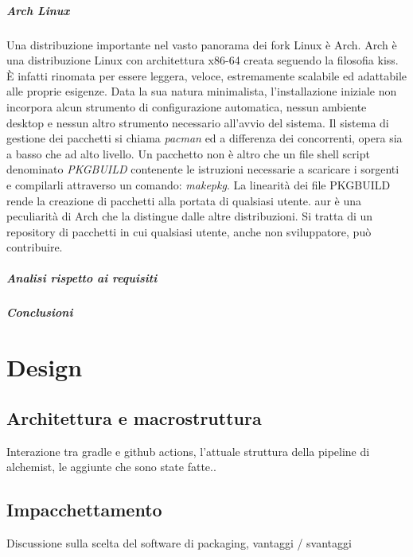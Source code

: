 \documentclass[12pt,a4paper,openright,twoside]{book}
\begin{document}
\paragraph{Arch Linux} Una distribuzione importante nel vasto panorama dei fork Linux è Arch. Arch è una distribuzione Linux con architettura x86-64 creata seguendo la filosofia \ac{kiss}. È infatti rinomata per essere leggera, veloce, estremamente scalabile ed adattabile alle proprie esigenze. Data la sua natura minimalista, l'installazione iniziale non incorpora alcun strumento di configurazione automatica, nessun ambiente desktop e nessun altro strumento necessario all'avvio del sistema. Il sistema di gestione dei pacchetti si chiama \textit{pacman} ed a differenza dei concorrenti, opera sia a basso che ad alto livello. Un pacchetto non è altro che un file shell script denominato \textit{PKGBUILD} contenente le istruzioni necessarie a scaricare i sorgenti e compilarli attraverso un comando: \textit{makepkg}. La linearità dei file PKGBUILD rende la creazione di pacchetti alla portata di qualsiasi utente. \ac{aur} è una peculiarità di Arch che la distingue dalle altre distribuzioni. Si tratta di un repository di pacchetti in cui qualsiasi utente, anche non sviluppatore, può contribuire. 

\paragraph{Analisi rispetto ai requisiti}



\paragraph{Conclusioni}

\chapter{Design}

\section{Architettura e macrostruttura}
Interazione tra gradle e github actions, l’attuale struttura della pipeline di alchemist, le aggiunte che sono state fatte..

\section{Impacchettamento}
Discussione sulla scelta del software di packaging, vantaggi / svantaggi
\end{document}

